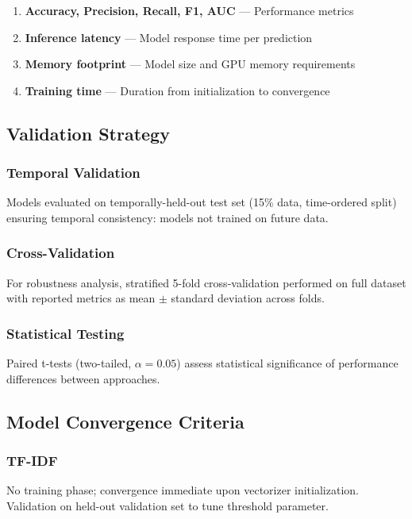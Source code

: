 \begin{enumerate}
  \item \textbf{Accuracy, Precision, Recall, F1, AUC} --- Performance metrics
  \item \textbf{Inference latency} --- Model response time per prediction
  \item \textbf{Memory footprint} --- Model size and GPU memory requirements
  \item \textbf{Training time} --- Duration from initialization to convergence
\end{enumerate}

\subsection{Validation Strategy}

\subsubsection{Temporal Validation}

Models evaluated on temporally-held-out test set (15\% data, time-ordered split) ensuring temporal consistency: models not trained on future data.

\subsubsection{Cross-Validation}

For robustness analysis, stratified 5-fold cross-validation performed on full dataset with reported metrics as mean $\pm$ standard deviation across folds.

\subsubsection{Statistical Testing}

Paired t-tests (two-tailed, $\alpha = 0.05$) assess statistical significance of performance differences between approaches.

\subsection{Model Convergence Criteria}

\subsubsection{TF-IDF}

No training phase; convergence immediate upon vectorizer initialization. Validation on held-out validation set to tune threshold parameter.

